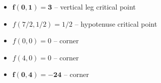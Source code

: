 \begin{enumerate}[leftmargin=0pt]
\begin{enumerate}
\begin{red}
\begin{itemize}
                \item $\mathbf{f(0,1) = 3}$ -- vertical leg critical point
                \item $f(7/2, 1/2) = 1/2$ -- hypotenuse critical point
                \item $f(0,0) = 0$ -- corner
                \item $f(4,0) = 0$ -- corner
                \item $\mathbf{f(0, 4) = -24}$ -- corner
            \end{itemize}
        \end{red}
    \end{enumerate}
    
\end{enumerate}

